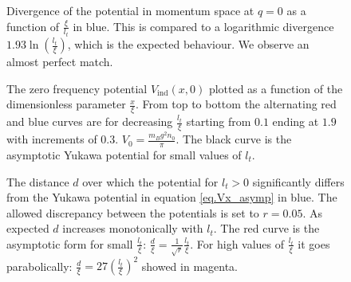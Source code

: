 \begin{figure} 
\begin{center}  
  
\caption{Divergence of the potential in momentum space at $q=0$ as a function of $\frac{\xi}{l_t}$ in blue. This is compared to a logarithmic divergence $1.93\ln\left(\frac{l_t}{\xi}\right)$, which is the expected behaviour. We observe an almost perfect match.}  
\label{fig.Vq0}  
\end{center}    
\end{figure}

\begin{figure} 
\begin{center}  
  
\caption{The zero frequency potential $V_\text{ind}(x,0)$ plotted as a function of the dimensionless parameter $\frac{x}{\xi}$. From top to bottom the alternating red and blue curves are for decreasing $\frac{l_t}{\xi}$ starting from $0.1$ ending at $1.9$ with increments of $0.3$. $V_0 = \frac{m_Bg^2n_0}{\pi}$. The black curve is the asymptotic Yukawa potential for small values of $l_t$.}  
\label{fig.Vx}  
\end{center}    
\end{figure}

\begin{figure} 
\begin{center}  
  
\caption{The distance $d$ over which the potential for $l_t > 0$ significantly differs from the Yukawa potential in equation \eqref{eq.Vx_asymp} in blue. The allowed discrepancy between the potentials is set to $r=0.05$. As expected $d$ increases monotonically with $l_t$. The red curve is the asymptotic form for small $\frac{l_t}{\xi}$: $\frac{d}{\xi}=\frac{1}{\sqrt{r}}\frac{l_t}{\xi}$. For high values of $\frac{l_t}{\xi}$ it goes parabolically: $\frac{d}{\xi}=27\left(\frac{l_t}{\xi}\right)^2$ showed in magenta.}  
\label{fig.Vx_disc}  
\end{center}    
\end{figure}

